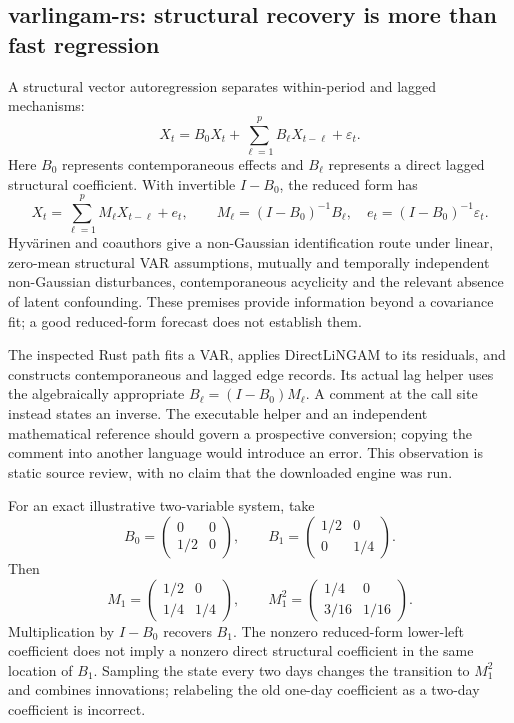 \subsection{varlingam-rs: structural recovery is more than fast regression}

A structural vector autoregression separates within-period and lagged
mechanisms:
\[
 X_t=B_0X_t+\sum_{\ell=1}^{p}B_\ell X_{t-\ell}+\varepsilon_t.
\]
Here $B_0$ represents contemporaneous effects and $B_\ell$ represents a direct
lagged structural coefficient. With invertible $I-B_0$, the reduced form has
\[
 X_t=\sum_{\ell=1}^{p}M_\ell X_{t-\ell}+e_t,\qquad
 M_\ell=(I-B_0)^{-1}B_\ell,\quad
 e_t=(I-B_0)^{-1}\varepsilon_t.
\]
Hyv\"arinen and coauthors give a non-Gaussian identification route under
linear, zero-mean structural VAR assumptions, mutually and temporally
independent non-Gaussian disturbances, contemporaneous acyclicity and the
relevant absence of latent confounding. These premises provide information
beyond a covariance fit; a good reduced-form forecast does not establish
them.
\citep{hyvarinen2010}

The inspected Rust path fits a VAR, applies DirectLiNGAM to its residuals,
and constructs contemporaneous and lagged edge records. Its actual lag helper
uses the algebraically appropriate $B_\ell=(I-B_0)M_\ell$.
A comment at the call site instead states an inverse. The executable helper
and an independent mathematical reference should govern a prospective
conversion; copying the comment into another language would introduce an
error. This observation is static source review, with no claim that the
downloaded engine was run.
\citep{exec17_temporal_varlingam}

For an exact illustrative two-variable system, take
\[
 B_0=\begin{pmatrix}0&0\\1/2&0\end{pmatrix},\qquad
 B_1=\begin{pmatrix}1/2&0\\0&1/4\end{pmatrix}.
\]
Then
\[
 M_1=\begin{pmatrix}1/2&0\\1/4&1/4\end{pmatrix},\qquad
 M_1^2=\begin{pmatrix}1/4&0\\3/16&1/16\end{pmatrix}.
\]
Multiplication by $I-B_0$ recovers $B_1$. The nonzero reduced-form
lower-left coefficient does not imply a nonzero direct structural coefficient
in the same location of $B_1$. Sampling the state every two days changes
the transition to $M_1^2$ and combines innovations; relabeling the old
one-day coefficient as a two-day coefficient is incorrect.
\citep{exec17_temporal_oracle}


